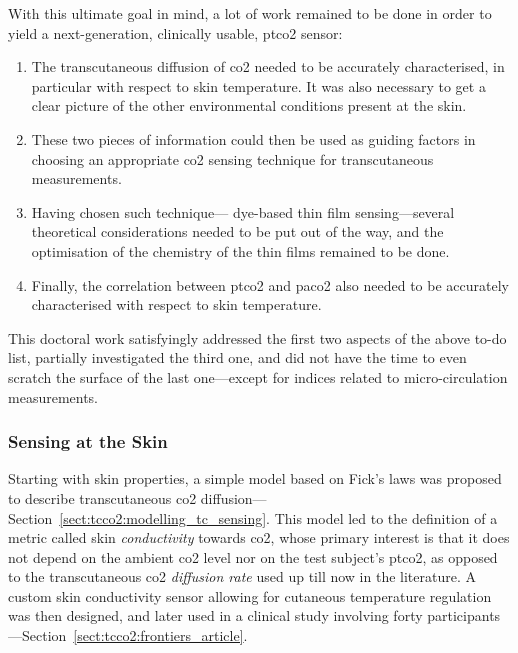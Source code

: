 With this ultimate goal in mind, a lot of work remained to be done in order to yield a next-generation, clinically usable, \gls{ptco2} sensor:
\begin{enumerate}
	\item The transcutaneous diffusion of \gls{co2} needed to be accurately characterised, in particular with respect to skin temperature. It was also necessary to get a clear picture of the other environmental conditions present at the skin.
	\item These two pieces of information could then be used as guiding factors in choosing an appropriate \gls{co2} sensing technique for transcutaneous measurements.
	\item Having chosen such technique---\ie{} dye-based thin film sensing---several theoretical considerations needed to be put out of the way, and the optimisation of the chemistry of the thin films remained to be done.
	\item Finally, the correlation between \gls{ptco2} and \gls{paco2} also needed to be accurately characterised with respect to skin temperature.
\end{enumerate}
This doctoral work satisfyingly addressed the first two aspects of the above to-do list, partially investigated the third one, and did not have the time to even scratch the surface of the last one---except for indices related to micro-circulation measurements.

\subsubsection{Sensing at the Skin}

Starting with skin properties, a simple model based on Fick's laws was proposed to describe transcutaneous \gls{co2} diffusion---Section~\ref{sect:tcco2:modelling_tc_sensing}. This model led to the definition of a metric called skin \emph{conductivity} towards \gls{co2}, whose primary interest is that it does not depend on the ambient \gls{co2} level nor on the test subject's \gls{ptco2}, as opposed to the transcutaneous \gls{co2} \emph{diffusion rate} used up till now in the literature. A custom skin conductivity sensor allowing for cutaneous temperature regulation was then designed, and later used in a clinical study involving forty participants---Section~\ref{sect:tcco2:frontiers_article}.

